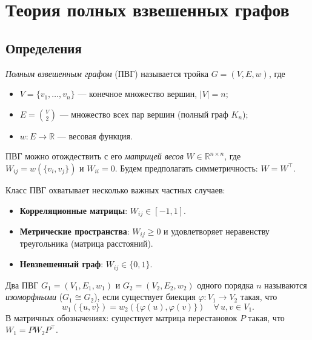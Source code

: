 
\section{Теория полных взвешенных графов}
\label{sec:theory}

\subsection{Определения}

\begin{definition}
\emph{Полным взвешенным графом} (ПВГ) называется тройка $G = (V, E, w)$, где
\begin{itemize}
    \item $V = \{v_1, \ldots, v_n\}$ — конечное множество вершин, $|V| = n$;
    \item $E = \binom{V}{2}$ — множество всех пар вершин (полный граф $K_n$);
    \item $w\colon E \to \mathbb{R}$ — весовая функция.
\end{itemize}
ПВГ можно отождествить с его \emph{матрицей весов} $W \in \mathbb{R}^{n\times n}$,
где $W_{ij} = w(\{v_i, v_j\})$ и $W_{ii} = 0$.
Будем предполагать симметричность: $W = W^\top$.
\end{definition}

\begin{remark}
Класс ПВГ охватывает несколько важных частных случаев:
\begin{itemize}
    \item \textbf{Корреляционные матрицы}: $W_{ij} \in [-1, 1]$.
    \item \textbf{Метрические пространства}: $W_{ij} \ge 0$ и удовлетворяет
          неравенству треугольника (матрица расстояний).
    \item \textbf{Невзвешенный граф}: $W_{ij} \in \{0, 1\}$.
\end{itemize}
\end{remark}

\begin{definition}
Два ПВГ $G_1 = (V_1, E_1, w_1)$ и $G_2 = (V_2, E_2, w_2)$ одного порядка $n$
называются \emph{изоморфными} ($G_1 \cong G_2$), если существует биекция
$\varphi\colon V_1 \to V_2$ такая, что
\[
    w_1(\{u, v\}) = w_2(\{\varphi(u), \varphi(v)\})
    \quad \forall\, u, v \in V_1.
\]
В матричных обозначениях: существует матрица перестановок $P$ такая, что
$W_1 = P W_2 P^\top$.
\end{definition}

